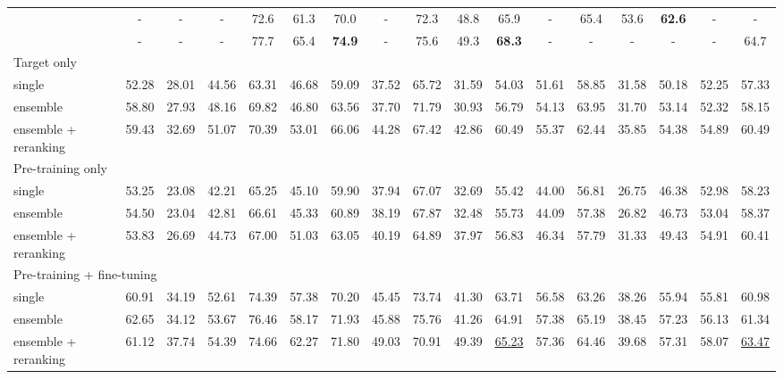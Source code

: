 \documentclass[11pt]{article}
\begin{document}
\begin{table*}[t]
\begin{tabular}{@{\extracolsep{2.5pt}}l ccc ccc|c ccc|cccc|cc@{}}
		& - & - & -
		& 72.6\phantom{0} & 61.3\phantom{0} & 70.0\phantom{0}
		& - & 72.3\phantom{0} & 48.8\phantom{0} & 65.9\phantom{0}
		& - & 65.4\phantom{0} & 53.6\phantom{0} & \textbf{62.6\phantom{0}}
		& - & - \\
		\citet{stahlberg-kumar-2021-synthetic}
		& - & - & -
		& 77.7\phantom{0} & 65.4\phantom{0} & \textbf{74.9\phantom{0}}
		& - & 75.6\phantom{0} & 49.3\phantom{0} & \textbf{68.3\phantom{0}}
		& - & - & - & -
		& - & 64.7\phantom{0} \\
		\hline
		\hline
		\multicolumn{17}{l}{Target only} \\
		single
		& 52.28 & 28.01 & 44.56 
		& 63.31 & 46.68 & 59.09 
		& 37.52 & 65.72 & 31.59 & 54.03 
		& 51.61 & 58.85 & 31.58 & 50.18
		& 52.25 & 57.33 \\
		ensemble
		& 58.80 & 27.93 & 48.16 
		& 69.82 & 46.80 & 63.56 
		& 37.70 & 71.79 & 30.93 & 56.79 
		& 54.13 & 63.95 & 31.70 & 53.14
		& 52.32 & 58.15 \\
		ensemble + reranking
		& 59.43 & 32.69 & 51.07 
		& 70.39 & 53.01 & 66.06 
		& 44.28 & 67.42 & 42.86 & 60.49 
		& 55.37 & 62.44 & 35.85 & 54.38 
		& 54.89 & 60.49 \\
		\hline
		\multicolumn{17}{l}{Pre-training only} \\
		single
		& 53.25 & 23.08 & 42.21 
		& 65.25 & 45.10 & 59.90  
		& 37.94 & 67.07 & 32.69 & 55.42 
		& 44.00 & 56.81 & 26.75 & 46.38 
		& 52.98 & 58.23 \\
		ensemble
		& 54.50 & 23.04 & 42.81 
		& 66.61 & 45.33 & 60.89  
		& 38.19 & 67.87 & 32.48 & 55.73 
		& 44.09 & 57.38 & 26.82 & 46.73 
		& 53.04 & 58.37 \\
		ensemble + reranking
		& 53.83 & 26.69 & 44.73 
		& 67.00 & 51.03 & 63.05 
		& 40.19 & 64.89 & 37.97 & 56.83 
		& 46.34 & 57.79 & 31.33 & 49.43 
		& 54.91 & 60.41 \\
		\hline
		\multicolumn{17}{l}{Pre-training + fine-tuning} \\
		single
		& 60.91 & 34.19 & 52.61 
		& 74.39 & 57.38 & 70.20 
		& 45.45 & 73.74 & 41.30 & 63.71 
		& 56.58 & 63.26 & 38.26 & 55.94 
		& 55.81 & 60.98 \\
		ensemble
		& 62.65 & 34.12 & 53.67 
		& 76.46 & 58.17 & 71.93 
		& 45.88 & 75.76 & 41.26 & 64.91 
		& 57.38 & 65.19 & 38.45 & 57.23 
		& 56.13 & 61.34 \\
		ensemble + reranking
		& 61.12 & 37.74 & 54.39 
		& 74.66 & 62.27 & 71.80 
		& 49.03 & 70.91 & 49.39 & \underline{65.23} 
		& 57.36 & 64.46 & 39.68 & 57.31 
		& 58.07 & \underline{63.47} \\

\end{tabular}
\end{table*}
\end{document}
